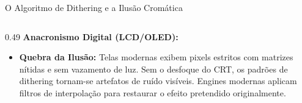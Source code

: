 \begin{frame}{O Algoritmo de Dithering e a Ilusão Cromática}
{\begin{columns}[T]
            \begin{column}{0.49\textwidth}    
                \scriptsize
                \textbf{Anacronismo Digital (LCD/OLED):}
                \begin{itemize}
                    \setlength{\itemsep}{1pt}
                    \item \textbf{Quebra da Ilusão:} Telas modernas exibem pixels estritos com matrizes nítidas e sem vazamento de luz. Sem o desfoque do CRT, os padrões de dithering tornam-se artefatos de ruído visíveis. Engines modernas aplicam filtros de interpolação para restaurar o efeito pretendido originalmente.
                \end{itemize}
            \end{column}
        \end{columns}   
    }
\end{frame}


